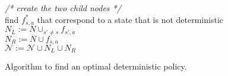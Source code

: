 \begin{figure}[h!]
{{ \hspace*{3ex} \hspace*{3ex} \hspace*{3ex} {\em {\footnotesize /* create the two child nodes */}}\\
 \hspace*{3ex} \hspace*{3ex} \hspace*{3ex} find $f^*_{s,a}$ that correspond to a state that is not deterministic  \\
 \hspace*{3ex} \hspace*{3ex} \hspace*{3ex} $N_L := N \cup_{s' \neq s} f_{s',a}$  \\
\hspace*{3ex} \hspace*{3ex} \hspace*{3ex} $N_R := N \cup f_{s,a}$  \\
\hspace*{3ex} \hspace*{3ex} \hspace*{3ex} $\mathcal{N} := \mathcal{N} \cup N_L \cup N_R$\\
}}
\caption{Algorithm to find an optimal deterministic policy.} \label{fig:basic_bb}
\end{figure}
